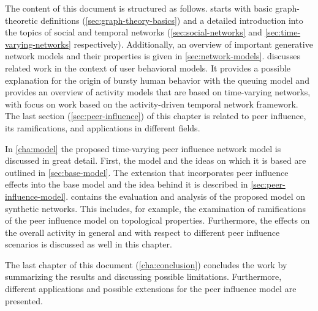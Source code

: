 The content of this document is structured as follows.
 starts with basic graph-theoretic definitions (\cref{sec:graph-theory-basics}) and a detailed introduction into the topics of social and temporal networks (\cref{sec:social-networks} and \cref{sec:time-varying-networks} respectively).
Additionally, an overview of important generative network models and their properties is given in \cref{sec:network-models}.
 discusses related work in the context of user behavioral models.
It provides a possible explanation for the origin of bursty human behavior with the queuing model and provides an overview of activity models that are based on time-varying networks, with focus on work based on the activity-driven temporal network framework.
The last section (\cref{sec:peer-influence}) of this chapter is related to peer influence, its ramifications, and applications in different fields.

In \cref{cha:model} the proposed time-varying peer influence network model is discussed in great detail.
First, the model and the ideas on which it is based are outlined in \cref{sec:base-model}.
The extension that incorporates peer influence effects into the base model and the idea behind it is described in \cref{sec:peer-influence-model}.
 contains the evaluation and analysis of the proposed model on synthetic networks.
This includes, for example, the examination of ramifications of the peer influence model on topological properties.
Furthermore, the effects on the overall activity in general and with respect to different peer influence scenarios is discussed as well in this chapter.

The last chapter of this document (\cref{cha:conclusion}) concludes the work
by summarizing the results and discussing possible limitations.
Furthermore, different applications and possible extensions for the peer influence model are presented.
